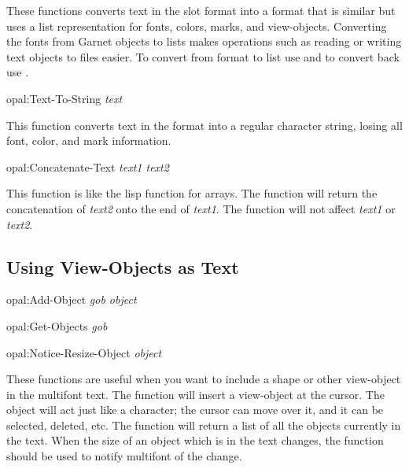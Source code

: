 These functions converts text in the  slot format into a format
that is similar but uses a list representation for fonts, colors,
marks, and view-objects.  Converting the
fonts from Garnet objects to lists makes operations such as reading or writing
text objects to files easier.  To convert from 
format to list use  and to convert back use
.

\begin{programexample}
opal:Text-To-String {\it text}\value{function}
\end{programexample}

This function converts text in the  format into a regular
character string, losing all font, color, and mark information.

\begin{programexample}
opal:Concatenate-Text {\it text1 text2}\value{function}
\end{programexample}

This function is like the lisp function  for arrays.  The
function will return the concatenation of {\it text2} onto the end of
{\it text1}.  The function will not affect {\it text1} or {\it text2}.


\begin{group}
\subsection{Using View-Objects as Text}
\label{objects}
\begin{programexample}
opal:Add-Object {\it gob object}\value{function}

opal:Get-Objects {\it gob}\value{function}

opal:Notice-Resize-Object {\it object}\value{function}
\end{programexample}
\end{group}

These functions are useful when you want to include a shape or other
view-object in the multifont text.  The function  will insert
a view-object at the cursor.  The object will act just like a character;  the
cursor can move over it, and it can be selected, deleted, etc.  The function
 will return a list of all the objects currently in the text.
When the size of an object which is in the text changes, the function
 should be used to notify multifont of the change.


